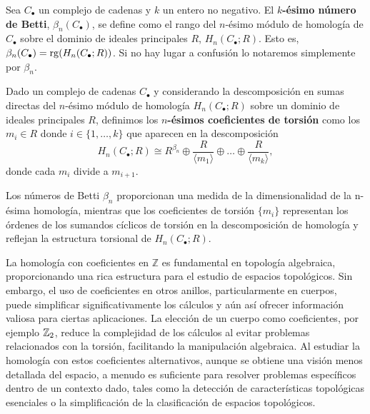 \begin{definicion}
	Sea \(C_{\bullet}\) un complejo de cadenas y \(k\) un entero no negativo. El
	\textbf{\(k\)-ésimo número de Betti}, \(\beta_{n}(C_{\bullet})\), se define como el
	rango del \(n\)-ésimo módulo de homología de \(C_{\bullet}\) sobre el dominio de ideales
	principales \(R\), \(H_{n}(C_{\bullet};R)\). Esto es,
	\(\beta_{n}(C_{\bullet}) = \operatorname{rg}(H_{n}(C_{\bullet};R))\). Si no hay lugar a confusión
	lo notaremos simplemente por \(\beta_{n}\).
\end{definicion}

\begin{definicion}
	Dado un complejo de cadenas \(C_{\bullet}\) y considerando la descomposición en sumas
	directas del \(n\)-ésimo módulo de homología \(H_{n}(C_{\bullet};R)\) sobre un dominio
	de ideales principales \(R\), definimos los \textbf{\(n\)-ésimos coeficientes de
		torsión} como los \(m_{i} \in R\) donde \(i \in \{1, \ldots, k\}\) que aparecen en
	la descomposición
	\[
	H_{n}(C_{\bullet};R) \cong R^{\beta_n}\oplus \frac{R}{\langle m_{1} \rangle}\oplus
	\ldots \oplus \frac{R}{\langle m_{k} \rangle},
	\]
	donde cada \(m_{i}\) divide a \(m_{i+1}\).
\end{definicion}

Los números de Betti \(\beta_{n}\) proporcionan una medida de la dimensionalidad
de la n-ésima homología, mientras que los coeficientes de torsión \(\{m_{i}\}\) representan
los órdenes de los sumandos cíclicos de torsión en la descomposición de homología
y reflejan la estructura torsional de \(H_{n}(C_{\bullet};R)\).

La homología con coeficientes en \(\mathbb{Z}\) es fundamental en topología algebraica, proporcionando una rica estructura para el estudio de espacios topológicos. Sin embargo, el uso de coeficientes en otros anillos, particularmente en cuerpos, puede simplificar significativamente los cálculos y aún así ofrecer información valiosa para ciertas aplicaciones. La elección de un cuerpo como coeficientes, por ejemplo \(\mathbb{Z}_2\), reduce la complejidad de los cálculos al evitar problemas relacionados con la torsión, facilitando la manipulación algebraica. Al estudiar la homología con estos coeficientes alternativos, aunque se obtiene una visión menos detallada del espacio, a menudo es suficiente para resolver problemas específicos dentro de un contexto dado, tales como la detección de características topológicas esenciales o la simplificación de la clasificación de espacios topológicos.

\endinput
